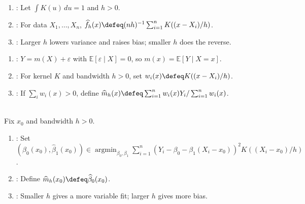 \begin{definition} \label{def:kernel-density-estimator} 
\begin{enumerate}[label=(\roman*)]
\setlength{\itemsep}{0pt}
\item {}: Let $\int K(u)\,du=1$ and $h>0$.
\item {}: For data $X_1,\ldots,X_n$, $\widehat{f}_h(x)\defeq(nh)^{-1}\sum_{i=1}^nK((x-X_i)/h)$.
\item {}: Larger $h$ lowers variance and raises bias; smaller $h$ does the reverse.
\end{enumerate}
\end{definition}

\begin{definition} \label{def:nonparametric-regression-smoothing} 
\begin{enumerate}[label=(\roman*)]
\setlength{\itemsep}{0pt}
\item {}: $Y=m(X)+\varepsilon$ with $\mathbb{E}[\varepsilon\mid X]=0$, so $m(x)=\mathbb{E}[Y\mid X=x]$.
\item {}: For kernel $K$ and bandwidth $h>0$, set $w_i(x)\defeq K((x-X_i)/h)$.
\item {}: If $\sum_iw_i(x)>0$, define $\widehat{m}_h(x)\defeq\sum_{i=1}^nw_i(x)Y_i/\sum_{i=1}^nw_i(x)$.
\end{enumerate}
\end{definition}

\begin{method} \label{meth:local-linear-regression-smoothing} \\
Fix $x_0$ and bandwidth $h>0$.
\begin{enumerate}[label=(\roman*)]
\setlength{\itemsep}{0pt}
\item {}: Set $(\widehat{\beta}_0(x_0),\widehat{\beta}_1(x_0))\in\operatorname*{argmin}_{\beta_0,\beta_1}\sum_{i=1}^n(Y_i-\beta_0-\beta_1(X_i-x_0))^2K((X_i-x_0)/h)$.
\item {}: Define $\widehat{m}_h(x_0)\defeq\widehat{\beta}_0(x_0)$.
\item {}: Smaller $h$ gives a more variable fit; larger $h$ gives more bias.
\end{enumerate}
\end{method}

